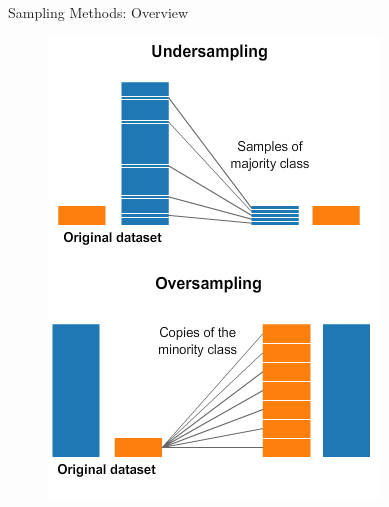 \documentclass[11pt,compress,t,notes=noshow, xcolor=table]{beamer}
\begin{document}
\begin{frame}{Sampling Methods: Overview}
{\begin{itemize}
\begin{minipage}{0.59\textwidth}
\begin{itemize}
				\end{itemize}
			\end{minipage}
            \hfill
			\begin{minipage}{0.3\textwidth}
					\begin{figure}[c]
					\centering
                    \includegraphics[width=\textwidth]{figure/under_oversampling.png}
				\end{figure}
			\end{minipage}
		\end{itemize}
	}
\end{frame}
	
\end{document}
